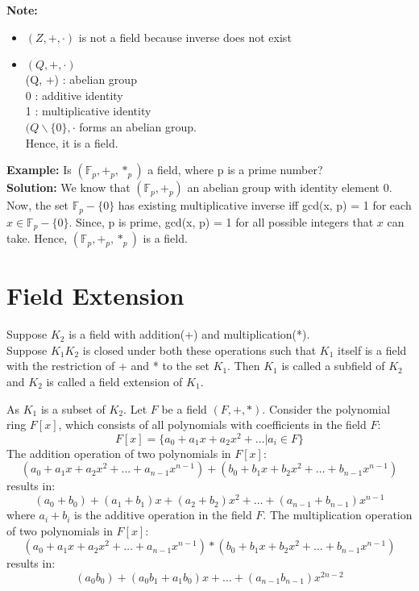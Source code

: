 \documentclass[11pt]{article}
\begin{document}
\textbf{Note:}\\
\begin{itemize}
    \item $(Z, +, \cdot)$ is not a field because inverse does not exist
    \item $(Q, +, \cdot)$\\
    (Q, +) : abelian group\\
    0 : additive identity\\
    1 : multiplicative identity\\
    $(Q \backslash \{0\}, \cdot$ forms an abelian group.\\
    Hence, it is a field.
\end{itemize}
\textbf{Example:} Is $(\mathbb{F}_p, +_p, *_p)$ a field, where p is a prime number?\\
\textbf{Solution:} We know that $(\mathbb{F}_p, +_p)$ an abelian group with identity element 0. Now, the set $\mathbb{F}_p - \{0\}$ has existing multiplicative inverse iff gcd(x, p) = 1 for each $x \in \mathbb{F}_p - \{0\}$. Since, p is prime, gcd(x, p) = 1 for all possible integers that $x$ can take. Hence, $(\mathbb{F}_p, +_p, *_p)$ is a field.\\



\section{Field Extension}
Suppose $K_2$ is a field with addition(+) and multiplication(*). \\
Suppose $K_1  K_2$ is closed under both these operations such that $K_1$ itself is a field with the restriction of + and * to the set $K_1$. Then $K_1$ is called a subfield of $K_2$ and $K_2$ is called a field extension of $K_1$.

As $K_1$ is a subset of $K_2$. Let $F$ be a field $(F, +, *)$. Consider the polynomial ring $F[x]$, which consists of all polynomials with coefficients in the field $F$:
\[ F[x] = \{a_0 + a_1x + a_2x^2 + \ldots | a_i \in F\} \]
The addition operation of two polynomials in $F[x]$:
\[
(a_0 + a_1x + a_2x^2 + \ldots + a_{n-1}x^{n-1}) + (b_0 + b_1x + b_2x^2 + \ldots + b_{n-1}x^{n-1})
\]
results in:
\[
(a_0 + b_0) + (a_1 + b_1)x + (a_2 + b_2)x^2 + \ldots + (a_{n-1} + b_{n-1})x^{n-1}
\]
where $a_i + b_i$ is the additive operation in the field $F$. The multiplication operation of two polynomials in $F[x]$:
\[
(a_0 + a_1x + a_2x^2 + \ldots + a_{n-1}x^{n-1}) * (b_0 + b_1x + b_2x^2 + \ldots + b_{n-1}x^{n-1})
\]
results in:
\[
(a_0b_0) + (a_0b_1 + a_1b_0)x + \ldots + (a_{n-1}b_{n-1})x^{2n-2}
\]
\end{document}
